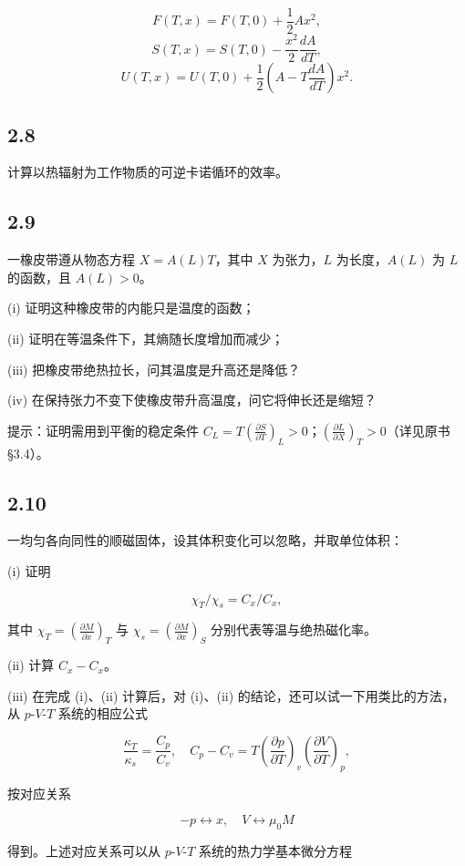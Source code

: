 $$F(T, x) = F(T, 0) + \frac{1}{2} Ax^2,$$
$$S(T, x) = S(T, 0) - \frac{x^2}{2} \frac{dA}{dT},$$
$$U(T, x) = U(T, 0) + \frac{1}{2} \left( A - T \frac{dA}{dT} \right)x^2.$$

\newpage
\subsection{2.8}
计算以热辐射为工作物质的可逆卡诺循环的效率。

\newpage
\subsection{2.9}
一橡皮带遵从物态方程 $X = A(L) T$，其中 $X$ 为张力，$L$ 为长度，$A(L)$ 为 $L$ 的函数，且 $A(L) > 0$。

(i) 证明这种橡皮带的内能只是温度的函数；

(ii) 证明在等温条件下，其熵随长度增加而减少；

(iii) 把橡皮带绝热拉长，问其温度是升高还是降低？

(iv) 在保持张力不变下使橡皮带升高温度，问它将伸长还是缩短？

提示：证明需用到平衡的稳定条件 $C_L = T \left( \frac{\partial S}{\partial T} \right)_L > 0$；$\left( \frac{\partial L}{\partial X} \right)_T > 0$（详见原书 §3.4）。

\newpage
\subsection{2.10}
一均匀各向同性的顺磁固体，设其体积变化可以忽略，并取单位体积：

(i) 证明

$$\chi_T / \chi_s = C_{x} / C_{x},$$

其中 $\chi_T = \left( \frac{\partial M}{\partial x} \right)_T$ 与 $\chi_s = \left( \frac{\partial M}{\partial x} \right)_S$ 分别代表等温与绝热磁化率。

(ii) 计算 $C_{x} - C_{x}$。

(iii) 在完成 (i)、(ii) 计算后，对 (i)、(ii) 的结论，还可以试一下用类比的方法，从 $p$-$V$-$T$ 系统的相应公式

$$\frac{\kappa_T}{\kappa_s} = \frac{C_p}{C_v}, \quad C_p - C_v = T \left( \frac{\partial p}{\partial T} \right)_v \left( \frac{\partial V}{\partial T} \right)_p,$$

按对应关系

$$-p \leftrightarrow x, \quad V \leftrightarrow \mu_0 M$$

得到。上述对应关系可以从 $p$-$V$-$T$ 系统的热力学基本微分方程

